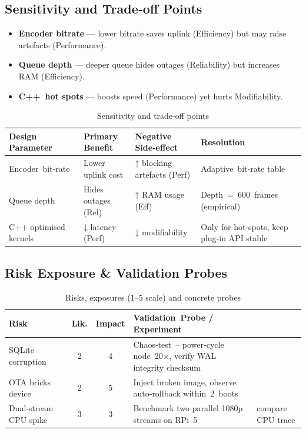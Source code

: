 \documentclass[11pt,a4paper]{article}
\begin{document}
\subsection{Sensitivity and Trade‑off Points}
\begin{itemize}
  \item \textbf{Encoder bitrate} — lower bitrate saves uplink (Efficiency) but may raise artefacts (Performance).
  \item \textbf{Queue depth} — deeper queue hides outages (Reliability) but increases RAM (Efficiency).
  \item \textbf{C++ hot spots} — boosts speed (Performance) yet hurts Modifiability.
\end{itemize}
\begin{table}[H]
\centering
\setlength{\extrarowheight}{2pt}
\begin{tabular}{|p{3.3cm}|p{2.8cm}|p{2.8cm}|p{2.8cm}|}
\hline
\textbf{Design Parameter} & \textbf{Primary Benefit} & \textbf{Negative Side‑effect} & \textbf{Resolution} \\ \hline
Encoder bit‑rate & Lower uplink cost & ↑ blocking artefacts (Perf) & Adaptive bit‑rate table \\ \hline
Queue depth & Hides outages (Rel) & ↑ RAM usage (Eff) & Depth = 600 frames (empirical) \\ \hline
C++ optimised kernels & ↓ latency (Perf) & ↓ modifiability & Only for hot‑spots, keep plug‑in API stable \\ \hline
\end{tabular}
\caption{Sensitivity and trade‑off points}
\label{tab:tradeoff}
\end{table}


\subsection{Risk Exposure \& Validation Probes}
\label{sec:risk_probes}
\begin{table}[H]
\centering
\setlength{\extrarowheight}{2pt}
\begin{tabular}{|p{3.1cm}|c|c|p{4.7cm}|}
\hline
\textbf{Risk} & \textbf{Lik.} & \textbf{Impact} & \textbf{Validation Probe / Experiment} \\ \hline
SQLite corruption & 2 & 4 & Chaos‑test – power‑cycle node 20×, verify WAL integrity checksum \\ \hline
OTA bricks device & 2 & 5 & Inject broken image, observe auto‑rollback within 2 boots \\ \hline
Dual‑stream CPU spike & 3 & 3 & Benchmark two parallel 1080p streams on RPi 5 & compare CPU trace \\ \hline
\end{tabular}
\caption{Risks, exposures (1–5 scale) and concrete probes}
\label{tab:risk_matrix}
\end{table}
\end{document}
